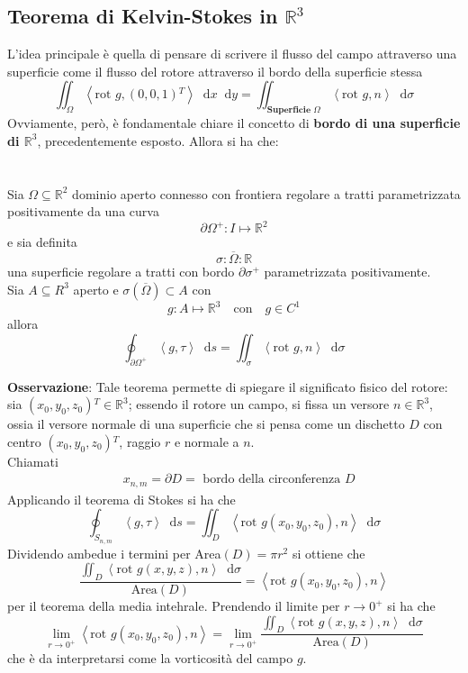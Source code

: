 \documentclass[a4paper]{extarticle}
\newcommand*\dif{\mathop{}\!\mathrm{d}}
\begin{document}
\vspace{1em}
\subsection{Teorema di Kelvin-Stokes in $\mathbb{R}^3$}
L'idea principale è quella di pensare di scrivere il flusso del campo attraverso una superficie come il flusso del rotore attraverso il bordo della superficie stessa
\[\iint_{\Omega} \left<\text{rot } g, (0,0,1){^T}\right> \dif x \dif y = \iint_{\textbf{Superficie } \Omega} \left<\text{rot } g, n\right> \dif \sigma\]
Ovviamente, però, è fondamentale chiare il concetto di \textbf{bordo di una superficie di $\mathbb{R}^3$}, precedentemente esposto. Allora si ha che:\\\\\\

Sia $\Omega \subseteq \mathbb{R}^2$ dominio aperto connesso con frontiera regolare a tratti parametrizzata positivamente da una curva
\[\partial \Omega^+ : I \longmapsto \mathbb{R}^2\]
e sia definita
\[\sigma : \overline{\Omega} : \mathbb{R}\]
una superficie regolare a tratti con bordo $\partial \sigma^+$ parametrizzata positivamente.\\
Sia $A \subseteq R^3$ aperto e $\sigma (\overline{\Omega}) \subset A$ con
\[g : A \longmapsto \mathbb{R}^3 \hspace{1em} \text{con} \hspace{1em} g \in C^1\]
allora
\[\oint_{\partial \Omega^+} \left<g,\tau\right> \dif s = \iint_\sigma \left<\text{rot } g, n\right> \dif \sigma\]

\vspace{2em}
\noindent
\textbf{Osservazione}: Tale teorema permette di spiegare il significato fisico del rotore: sia $(x_0,y_0,z_0){^T} \in \mathbb{R}^3$; essendo il rotore un campo, si fissa un versore $n \in \mathbb{R}^3$, ossia il versore normale di una superficie che si pensa come un dischetto $D$ con centro $(x_0,y_0,z_0){^T}$, raggio $r$ e normale a $n$.\\
Chiamati
\begin{align*}
    &x_{n,m} = \partial D = \text{ bordo della circonferenza } D
\end{align*}
Applicando il teorema di Stokes si ha che
\[\oint_{S_{n,m}} \left<g,\tau\right> \dif s = \iint_{D} \left<\text{rot } g(x_0,y_0,z_0), n\right> \dif \sigma\]
Dividendo ambedue i termini per Area$(D)=\pi r^2$ si ottiene che
\[\dfrac{\displaystyle{\iint_{D} \left<\text{rot } g(x,y,z), n\right> \dif \sigma}}{\text{Area}(D)} = \left<\text{rot }g(x_0,y_0,z_0),n\right>\]
per il teorema della media intehrale. Prendendo il limite per $r \to 0^+$ si ha che
\[\lim_{r \to 0^+} \left<\text{rot }g(x_0,y_0,z_0),n\right> = \lim_{r \to 0^+} \dfrac{\displaystyle{\iint_{D} \left<\text{rot } g(x,y,z), n\right> \dif \sigma}}{\text{Area}(D)}\]
che è da interpretarsi come la vorticosità del campo $g$.
\end{document}
